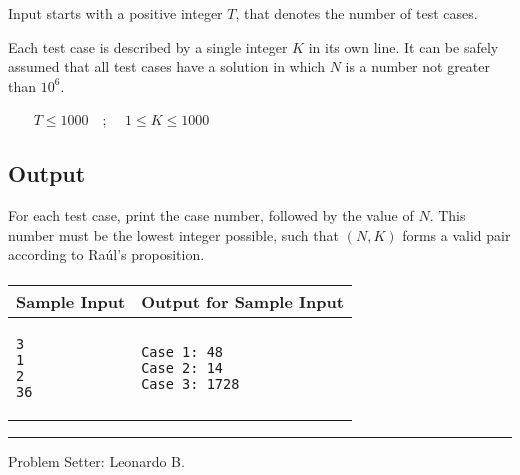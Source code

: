 \documentclass[12pt]{article}
\newcommand{\FFATitle}[1]{{%
  \color{tango-skyblue-2}\sffamily\large\bfseries\hspace{-0.4em} #1}}
\begin{document}
Input starts with a positive integer $T$, that denotes the number of
test cases.

Each test case is described by a single integer $K$ in its own line. It
can be safely assumed that all test cases have a solution in which $N$
is a number not greater than $10^6$.

~~~ $T \leq 1000$~~; ~~$1 \leq K \leq 1000$

\subsection{Output}\label{output}

For each test case, print the case number, followed by the value of $N$.
This number must be the lowest integer possible, such that $(N, K)$
forms a valid pair according to Raúl's proposition.

\paragraph{}

\vspace{-20pt}

\noindent

\begin{tabular}{|l|l|}
  \hline
  \FFATitle{Sample Input} &
  \FFATitle{Output for Sample Input} \\
  \hline
  \begin{minipage}[t]{0.48\textwidth}
    \vspace{-8pt}
    \begin{verbatim}3
1
2
36\end{verbatim}
    \vspace{-4pt}
  \end{minipage} &
  \begin{minipage}[t]{0.48\textwidth}
    \vspace{-8pt}
    \begin{verbatim}Case 1: 48
Case 2: 14
Case 3: 1728\end{verbatim}
    \vspace{-4pt}
  \end{minipage} \\
  \hline
\end{tabular}

\begin{center}\rule{3in}{0.4pt}\end{center}

Problem Setter: Leonardo B.
\end{document}
